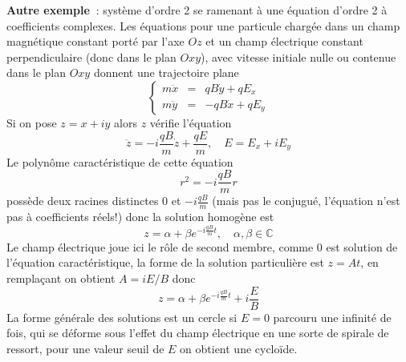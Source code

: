 \documentclass[a4paper,11pt]{article}
\begin{document}
\begin{giacjshere}
{\bf Autre exemple~}: syst\`eme d'ordre 2 se ramenant \`a une \'equation
d'ordre 2 \`a coefficients complexes. Les \'equations pour une particule
charg\'ee dans un champ magn\'etique constant port\'e par l'axe $Oz$ et
un champ \'electrique constant perpendiculaire (donc dans le plan $Oxy$),
avec vitesse initiale nulle ou contenue dans le plan $Oxy$ donnent une 
trajectoire plane
$$ \left\{ \begin{array}{ccc} m\ddot{x}&=&qB\dot{y} +qE_x\\
m\ddot{y}&=& -qB\dot{x} +qE_y
\end{array} \right.$$
Si on pose $z=x+iy$ alors $z$ v\'erifie l'\'equation
$$ \ddot{z}=-i\frac{qB}{m} \dot{z}+\frac{qE}{m}, \quad E=E_x+iE_y$$
Le polyn\^ome caract\'eristique de cette \'equation 
$$r^2=-i\frac{qB}{m}r$$
poss\`ede deux racines distinctes 0 et $-i\frac{qB}{m}$ (mais pas le
conjugu\'e, l'\'equation n'est pas \`a coefficients r\'eels!) donc
la solution homog\`ene est 
$$z=\alpha + \beta e^{-i\frac{qB}{m}t}, \quad \alpha,\beta \in \mathbb{C}$$
Le champ \'electrique joue ici le r\^ole de second membre, comme 0
est solution de l'\'equation caract\'eristique, la forme de la 
solution particuli\`ere est $z=At$, en rempla\c{c}ant on obtient 
$ A=iE/B$ donc
$$z=\alpha + \beta e^{-i\frac{qB}{m}t}+i\frac{E}{B} $$
La forme g\'en\'erale des solutions est un cercle si $E=0$
parcouru une infinit\'e de fois, qui se d\'eforme sous l'effet
du champ \'electrique en une sorte de spirale de ressort, pour
une valeur seuil de $E$ on obtient une cyclo\"ide.


\end{giacjshere}
\end{document}
